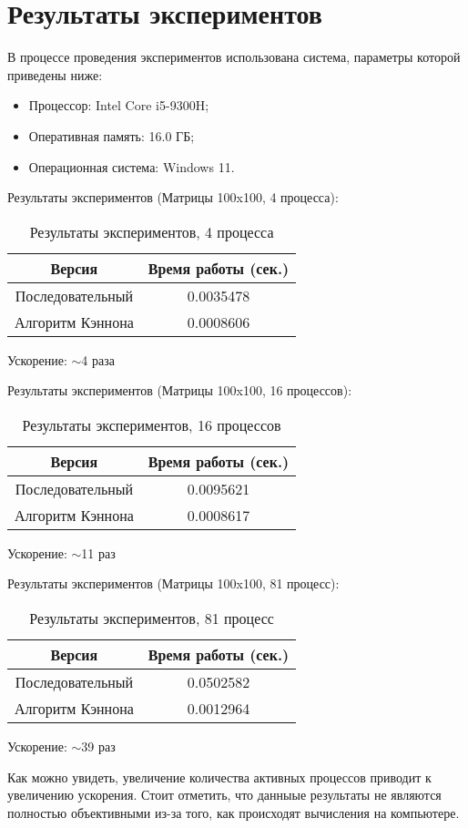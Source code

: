 \documentclass{report}
\begin{document}
\section*{Результаты экспериментов}
\par В процессе проведения экспериментов использована система, параметры которой приведены ниже:
\begin{itemize}
\item Процессор: Intel Core i5-9300H;
\item Оперативная память: 16.0 ГБ;
\item Операционная система: Windows 11.
\end{itemize}
\par Результаты экспериментов (Матрицы 100x100, 4 процесса):
\begin{table}[!h]
\centering
\begin{tabular}{| c | c |}
\hline
Версия & Время работы (сек.)\\
\hline
Последовательный&0.0035478\\
Алгоритм Кэннона&0.0008606\\
\hline
\end{tabular}
\caption{Результаты экспериментов, 4 процесса}
\end{table}
\par Ускорение:  \(\sim \)4 раза
\par Результаты экспериментов (Матрицы 100x100, 16 процессов):
\begin{table}[!h]
\centering
\begin{tabular}{| c | c |}
\hline
Версия & Время работы (сек.)\\
\hline
Последовательный&0.0095621\\
Алгоритм Кэннона&0.0008617\\
\hline
\end{tabular}
\caption{Результаты экспериментов, 16 процессов}
\end{table}
\par Ускорение:  \(\sim \)11 раз
\par Результаты экспериментов (Матрицы 100x100, 81 процесс):
\begin{table}[!h]
\centering
\begin{tabular}{| c | c |}
\hline
Версия & Время работы (сек.)\\
\hline
Последовательный&0.0502582\\
Алгоритм Кэннона&0.0012964\\
\hline
\end{tabular}
\caption{Результаты экспериментов, 81 процесс}
\end{table}
\par Ускорение:  \(\sim \)39 раз
\par Как можно увидеть, увеличение количества активных процессов приводит к увеличению ускорения. Стоит отметить, что данныые результаты не являются полностью объективными из-за того, как происходят вычисления на компьютере.
\newpage
\end{document}
